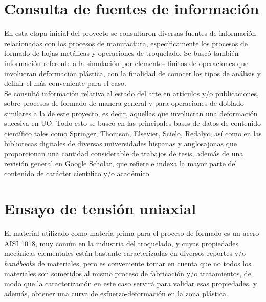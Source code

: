 \section{Consulta de fuentes de información}

En esta etapa inicial del proyecto se consultaron diversas fuentes de información 
relacionadas con los procesos de manufactura, específicamente los procesos 
de formado de hojas metálicas y operaciones de troquelado. Se buscó también información 
referente a la simulación por elementos finitos de operaciones que involucran 
deformación plástica, con la finalidad de conocer los tipos de análisis y definir 
el más conveniente para el caso. \\

Se consultó información relativa al estado del arte en artículos y/o publicaciones, 
sobre procesos de formado de manera general y para operaciones de doblado similares a la 
de este proyecto, es decir, aquellas que involucran una deformación sucesiva en UO. 
Todo esto se buscó en las principales bases de datos de contenido científico tales 
como Springer, Thomson, Elsevier, Scielo, Redalyc, así como en las bibliotecas 
digitales de diversas universidades hispanas y anglosajonas que proporcionan una 
cantidad considerable de trabajos de tesis, además de una revisión general en 
Google Scholar, que refiere e indexa la mayor parte del contenido de carácter científico 
y/o académico.

\section{Ensayo de tensión uniaxial}


El material utilizado como materia prima para el proceso de formado es un acero AISI 1018, 
muy común en la industria del troquelado, y cuyas propiedades mecánicas elementales están 
bastante caracterizadas en diversos reportes y/o \textit{handbooks} de materiales, pero 
es conveniente tomar en cuenta que no todos los materiales son sometidos al mismo proceso 
de fabricación y/o tratamientos, de modo que la caracterización en este caso servirá 
para validar esas propiedades, y además, obtener una curva de esfuerzo-deformación en la 
zona plástica.


